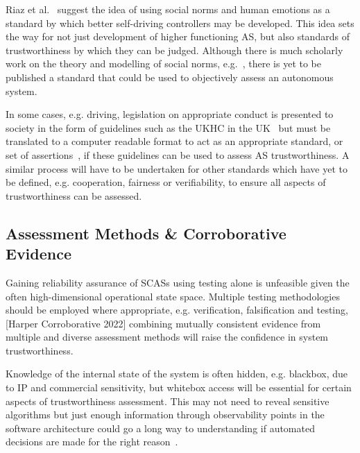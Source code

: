Riaz et al.~\cite{Riaz2018} suggest the idea of using social norms and human emotions as a standard by which better self-driving controllers may be developed. This idea sets the way for not just development of higher functioning AS, but also standards of trustworthiness by which they can be judged. Although there is much scholarly work on the theory and modelling of social norms, e.g.~\cite{hechter2001social}, there is yet to be published a standard that could be used to objectively assess an autonomous system. 

In some cases, e.g. driving, legislation on appropriate conduct is presented to society in the form of guidelines such as the UKHC in the UK~\cite{highwayCode} but must be translated to a computer readable format to act as an appropriate standard, or set of assertions~\cite{harper2021safety}, if these guidelines can be used to assess AS trustworthiness. A similar process will have to be undertaken for other standards which have yet to be defined, e.g. cooperation, fairness or verifiability, to ensure all aspects of trustworthiness can be assessed. 



\subsection{Assessment Methods \& Corroborative Evidence}
Gaining reliability assurance of SCASs using testing alone is unfeasible given the often high-dimensional operational state space. Multiple testing methodologies should be employed where appropriate, e.g. verification, falsification and testing, [Harper Corroborative 2022] combining mutually consistent evidence from multiple and diverse assessment methods will raise the confidence in system trustworthiness.

Knowledge of the internal state of the system is often hidden, e.g. blackbox, due to IP and commercial sensitivity, but whitebox access will be essential for certain aspects of trustworthiness assessment. This may not need to reveal sensitive algorithms but just enough information through observability points in the software architecture could go a long way to understanding if automated decisions are made for the right reason~\cite{koopman2018toward}. 




